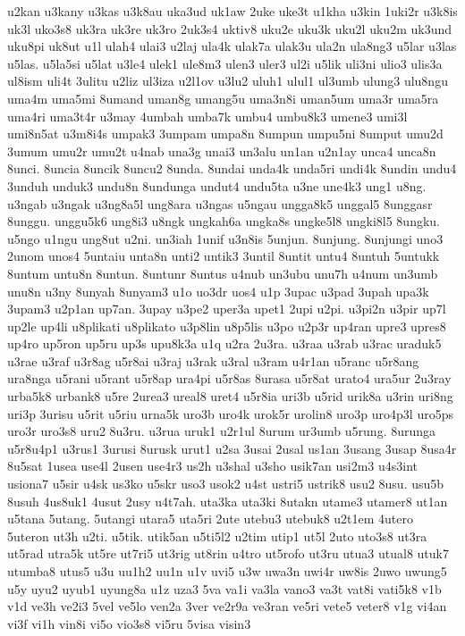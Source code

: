 {u2kan u3kany u3kas u3k8au uka3ud uk1aw 2uke uke3t u1kha u3kin 1uki2r
u3k8is uk3l uko3s8 uk3ra uk3re uk3ro 2uk3s4 uktiv8 uku2e uku3k uku2l uku2m
uk3und uku8pi uk8ut u1l ulah4 ulai3 u2laj ula4k ulak7a ulak3u ula2n
ula8ng3 u5lar u3las u5las. u5la5si u5lat u3le4 ulek1 ule8m3 ulen3 uler3
ul2i u5lik uli3ni ulio3 ulis3a ul8ism uli4t 3ulitu u2liz ul3iza u2l1ov
u3lu2 uluh1 ulul1 ul3umb ulung3 ulu8ngu uma4m uma5mi 8umand uman8g umang5u
uma3n8i uman5um uma3r uma5ra uma4ri uma3t4r u3may 4umbah umba7k umbu4
umbu8k3 umene3 umi3l umi8n5at u3m8i4s umpak3 3umpam umpa8n 8umpun umpu5ni
8umput umu2d 3umum umu2r umu2t u4nab una3g unai3 un3alu un1an u2n1ay unca4
unca8n 8unci. 8uncia 8uncik 8uncu2 8unda. 8undai unda4k unda5ri undi4k
8undin undu4 3unduh unduk3 undu8n 8undunga undut4 undu5ta u3ne une4k3 ung1
u8ng. u3ngab u3ngak u3ng8a5l ung8ara u3ngas u5ngau ungga8k5 unggal5
8unggasr 8unggu. unggu5k6 ung8i3 u8ngk ungkah6a ungka8s ungke5l8 ungki8l5
8ungku. u5ngo u1ngu ung8ut u2ni. un3iah 1unif u3n8is 5unjun. 8unjung.
8unjungi uno3 2unom unos4 5untaiu unta8n unti2 untik3 3until 8untit untu4
8untuh 5untukk 8untum untu8n 8untun. 8untunr 8untus u4nub un3ubu unu7h
u4num un3umb unu8n u3ny 8unyah 8unyam3 u1o uo3dr uos4 u1p 3upac u3pad
3upah upa3k 3upam3 u2p1an up7an. 3upay u3pe2 uper3a upet1 2upi u2pi.
u3pi2n u3pir up7l up2le up4li u8plikati u8plikato u3p8lin u8p5lis u3po
u2p3r up4ran upre3 upres8 up4ro up5ron up5ru up3s upu8k3a u1q u2ra 2u3ra.
u3raa u3rab u3rac uraduk5 u3rae u3raf u3r8ag u5r8ai u3raj u3rak u3ral
u3ram u4r1an u5ranc u5r8ang ura8nga u5rani u5rant u5r8ap ura4pi u5r8as
8urasa u5r8at urato4 ura5ur 2u3ray urba5k8 urbank8 u5re 2urea3 ureal8
uret4 u5r8ia uri3b u5rid urik8a u3rin uri8ng uri3p 3urisu u5rit u5riu
urna5k uro3b uro4k urok5r urolin8 uro3p uro4p3l uro5ps uro3r uro3s8 uru2
8u3ru. u3rua uruk1 u2r1ul 8urum ur3umb u5rung. 8urunga u5r8u4p1 u3rus1
3urusi 8urusk urut1 u2sa 3usai 2usal us1an 3usang 3usap 8usa4r 8u5sat
1usea use4l 2usen use4r3 us2h u3shal u3sho usik7an usi2m3 u4s3int usiona7
u5sir u4sk us3ko u5skr uso3 usok2 u4st ustri5 ustrik8 usu2 8usu. usu5b
8usuh 4us8uk1 4usut 2usy u4t7ah. uta3ka uta3ki 8utakn utame3 utamer8 ut1an
u5tana 5utang. 5utangi utara5 uta5ri 2ute utebu3 utebuk8 u2t1em 4utero
5uteron ut3h u2ti. u5tik. utik5an u5ti5l2 u2tim utip1 ut5l 2uto uto3s8
ut3ra ut5rad utra5k ut5re ut7ri5 ut3rig ut8rin u4tro ut5rofo ut3ru utua3
utual8 utuk7 utumba8 utus5 u3u uu1h2 uu1n u1v uvi5 u3w uwa3n uwi4r uw8is
2uwo uwung5 u5y uyu2 uyub1 uyung8a u1z uza3 5va va1i va3la vano3 va3t
vat8i vati5k8 v1b v1d ve3h ve2i3 5vel ve5lo ven2a 3ver ve2r9a ve3ran ve5ri
vete5 veter8 v1g vi4an vi3f vi1h vin8i vi5o vio3s8 vi5ru 5visa visin3
}
